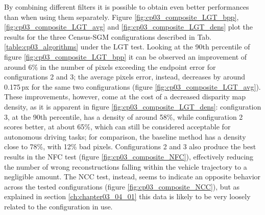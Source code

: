 By combining different filters it is possible to obtain even better performances than when using them separately. Figure \ref{fig:cp03_composite_LGT_bpp}, \ref{fig:cp03_composite_LGT_avg} and \ref{fig:cp03_composite_LGT_dens} plot the results for the three Census-SGM configurations described in Tab. \ref{table:cp03_algorithms} under the LGT test. Looking at the 90th percentile of figure \ref{fig:cp03_composite_LGT_bpp} it can be observed an improvement of around 6\% in the number of pixels exceeding the endpoint error for configurations 2 and 3; the average pixels error, instead, decreases by around 0.175\,px for the same two configurations (figure \ref{fig:cp03_composite_LGT_avg}). These improvements, however, come at the cost of a decreased disparity map density, as it is apparent in figure \ref{fig:cp03_composite_LGT_dens}: configuration 3, at the 90th percentile, has a density of around 58\%, while configuration 2 scores better, at about 65\%, which can still be considered acceptable for autonomous driving tasks; for comparison, the baseline 
method has a density close to 78\%, with 12\% bad pixels. Configurations 2 and 3 also produce the best results in the NFC test (figure \ref{fig:cp03_composite_NFC}), effectively reducing the number of wrong reconstructions falling within the vehicle trajectory to a negligible amount. The NCC test, instead, seems to indicate an opposite behavior across the tested configurations (figure \ref{fig:cp03_composite_NCC}), but as explained in section \ref{ch:chapter03_04_01} this data is likely to be very loosely related to the configuration in use.

